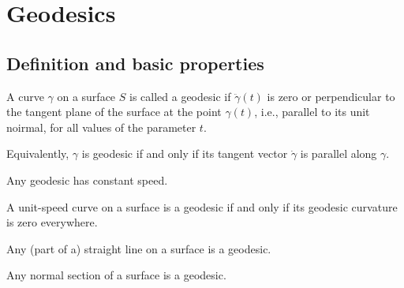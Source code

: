 \section{Geodesics}

\subsection{Definition and basic properties}

\begin{defn}
  A curve $\gamma$ on a surface $S$ is called a geodesic if $\ddot{\gamma}(t)$ is zero
  or perpendicular to the tangent plane of the surface at the point $\gamma(t)$, i.e.,
  parallel to its unit noirmal, for all values of the parameter $t$.
\end{defn}

\begin{remark}
  Equivalently, $\gamma$ is geodesic if and only if its tangent vector $\dot{\gamma}$
  is parallel along $\gamma$.
\end{remark}

\begin{proposition}
  Any geodesic has constant speed.
\end{proposition}

\begin{proposition}
  A unit-speed curve on a surface is a geodesic if and only if its geodesic
  curvature is zero everywhere.
\end{proposition}

\begin{proposition}
  Any (part of a) straight line on a surface is a geodesic.
\end{proposition}

\begin{proposition}
  Any normal section of a surface is a geodesic.
\end{proposition}
